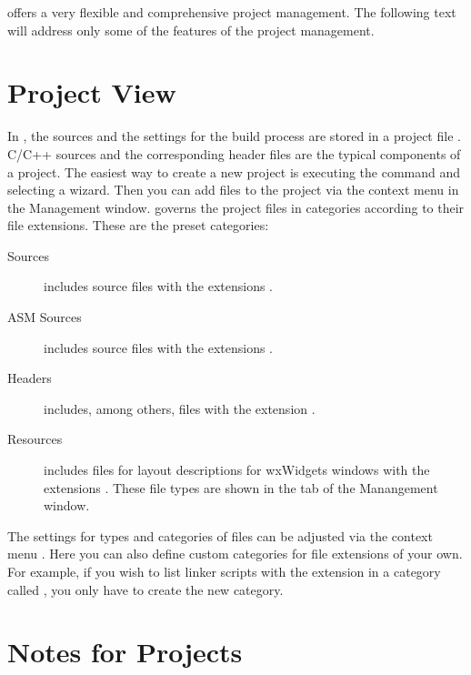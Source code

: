 \codeblocks offers a very flexible and comprehensive project management. The following text will address only some of the features of the project management.

\section{Project View}\label{sec:categories}

In \codeblocks, the sources and the settings for the build process are stored in a project file . C/C++ sources and the corresponding header files are the typical components of a project. The easiest way to create a new project is  executing the command  and selecting a wizard. Then you can add files to the project via the context menu  in the Management window. \codeblocks governs the project files in categories according to their file extensions. These are the preset categories:

\begin{description}
\item[Sources] includes source files with the extensions .
\item[ASM Sources] includes source files with the extensions .
\item[Headers] includes, among others, files with the extension .
\item[Resources] includes files for layout descriptions for wxWidgets windows with the extensions . These file types are shown in the  tab of the Manangement window.
\end{description}

The settings for types and categories of files can be adjusted via the context menu . Here you can also define custom categories for file extensions of your own. For example, if you wish to list linker scripts with the  extension in a category called , you only have to create the new category.


\section{Notes for Projects}

